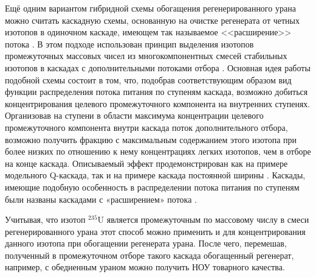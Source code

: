 Ещё одним вариантом гибридной схемы обогащения регенерированного урана можно считать каскадную схемы, основанную на очистке регенерата от четных изотопов в одиночном каскаде, имеющем так называемое <<расширение>> потока \cite{palkinRestorationIsotopicComposition2020}. В этом подходе использован принцип выделения изотопов промежуточных массовых чисел из многокомпонентных смесей стабильных изотопов в каскадах с дополнительными потоками отбора \cite{smirnovQKASKADYDLYaPOLUChENIYa2013,smirnovVliyanieProfilyaPotoka2010,palkinMnogopotochnyeKaskadyDlya2015}. 
Основная идея работы подобной схемы состоит в том, что, подобрав соответствующим образом вид функции распределения потока питания по ступеням каскада, возможно добиться концентрирования целевого промежуточного компонента на внутренних ступенях. Организовав на ступени в области максимума концентрации целевого промежуточного компонента внутри каскада поток дополнительного отбора, возможно получить фракцию с максимальным содержанием этого изотопа при более низких по отношению к нему концентрациях легких изотопов, чем в отборе на конце каскада.
Описываемый эффект продемонстрирован как на примере модельного Q-каскада, так и на примере каскада постоянной ширины \cite{smirnovDesignCascadeLocally2015}. Каскады, имеющие подобную особенность в распределении потока питания по ступеням были названы каскадами с «расширением» потока \cite{smirnovVliyanieProfilyaPotoka2010}.

Учитывая, что изотоп $^{235}$U является промежуточным по массовому числу в смеси регенерированного урана этот способ можно применить и для концентрирования данного изотопа при обогащении регенерата урана. После чего, перемешав, полученный в промежуточном отборе такого каскада обогащенный регенерат, например, с обедненным ураном можно получить НОУ товарного качества.


